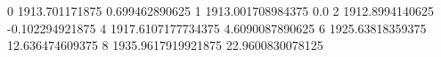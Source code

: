 0 1913.701171875 0.699462890625
1 1913.001708984375 0.0
2 1912.8994140625 -0.102294921875
4 1917.6107177734375 4.6090087890625
6 1925.63818359375 12.636474609375
8 1935.9617919921875 22.9600830078125
